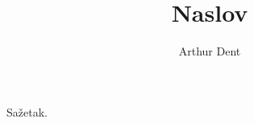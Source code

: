 \documentclass[times, utf8, seminar]{fer}
\begin{document}
\title{Naslov}

\author{Arthur Dent}


\maketitle

\tableofcontents








\appendix


\begin{sazetak}
Sažetak.

\end{sazetak}
\end{document}
